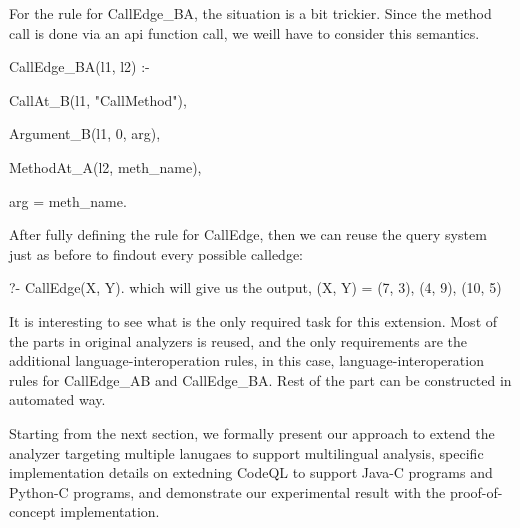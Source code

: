 For the rule for CallEdge\_BA, the situation is a bit trickier.  Since the
method call is done via an api function call, we weill have to consider this
semantics.

CallEdge\_BA(l1, l2) :-

    CallAt\_B(l1, "CallMethod"),
    
    Argument\_B(l1, 0, arg),
    
    MethodAt\_A(l2, meth\_name),
    
    arg = meth\_name.

After fully defining the rule for CallEdge, then we can reuse the query system
just as before to findout every possible calledge:

?- CallEdge(X, Y).
which will give us the output, (X, Y) = (7, 3), (4, 9), (10, 5)

It is interesting to see what is the only required task for this extension.
Most of the parts in original analyzers is reused, and the only requirements
are the additional language-interoperation rules, in this case,
language-interoperation rules for CallEdge\_AB and CallEdge\_BA. Rest of the
part can be constructed in automated way.

Starting from the next section, we formally present our approach to extend the
analyzer targeting multiple lanugaes to support multilingual analysis, specific
implementation details on extedning CodeQL to support Java-C programs and
Python-C programs, and demonstrate our experimental result with the
proof-of-concept implementation.
